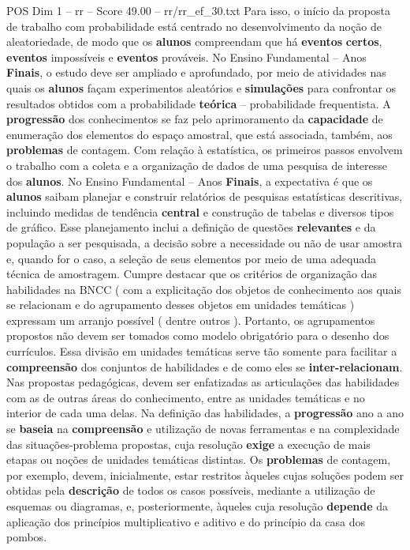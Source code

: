 \begin{textsample}{POS Dim 1 – rr – Score 49.00 – rr/rr\_ef\_30.txt}
Para isso, o início da proposta de trabalho com probabilidade está centrado no desenvolvimento da noção de aleatoriedade, de modo que os \textbf{alunos} compreendam que há \textbf{eventos} \textbf{certos}, \textbf{eventos} impossíveis e \textbf{eventos} prováveis.
No Ensino Fundamental – Anos \textbf{Finais}, o estudo deve ser ampliado e aprofundado, por meio de atividades nas quais os \textbf{alunos} façam experimentos aleatórios e \textbf{simulações} para confrontar os resultados obtidos com a probabilidade \textbf{teórica} – probabilidade frequentista.
A \textbf{progressão} dos conhecimentos se faz pelo aprimoramento da \textbf{capacidade} de enumeração dos elementos do espaço amostral, que está associada, também, aos \textbf{problemas} de contagem.
Com relação à estatística, os primeiros passos envolvem o trabalho com a coleta e a organização de dados de uma pesquisa de interesse dos \textbf{alunos}.
No Ensino Fundamental – Anos \textbf{Finais}, a expectativa é que os \textbf{alunos} saibam planejar e construir relatórios de pesquisas estatísticas descritivas, incluindo medidas de tendência \textbf{central} e construção de tabelas e diversos tipos de gráfico.
Esse planejamento inclui a definição de questões \textbf{relevantes} e da população a ser pesquisada, a decisão sobre a necessidade ou não de usar amostra e, quando for o caso, a seleção de seus elementos por meio de uma adequada técnica de amostragem.
Cumpre destacar que os critérios de organização das habilidades na BNCC ( com a explicitação dos objetos de conhecimento aos quais se relacionam e do agrupamento desses objetos em unidades temáticas ) expressam um arranjo possível ( dentre outros ).
Portanto, os agrupamentos propostos não devem ser tomados como modelo obrigatório para o desenho dos currículos.
Essa divisão em unidades temáticas serve tão somente para facilitar a \textbf{compreensão} dos conjuntos de habilidades e de como eles se \textbf{inter-relacionam}.
Nas propostas pedagógicas, devem ser enfatizadas as articulações das habilidades com as de outras áreas do conhecimento, entre as unidades temáticas e no interior de cada uma delas.
Na definição das habilidades, a \textbf{progressão} ano a ano se \textbf{baseia} na \textbf{compreensão} e utilização de novas ferramentas e na complexidade das situações-problema propostas, cuja resolução \textbf{exige} a execução de mais etapas ou noções de unidades temáticas distintas.
Os \textbf{problemas} de contagem, por exemplo, devem, inicialmente, estar restritos àqueles cujas soluções podem ser obtidas pela \textbf{descrição} de todos os casos possíveis, mediante a utilização de esquemas ou diagramas, e, posteriormente, àqueles cuja resolução \textbf{depende} da aplicação dos princípios multiplicativo e aditivo e do princípio da casa dos pombos.

\end{textsample}
